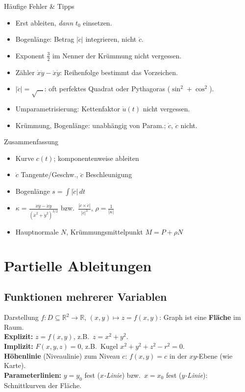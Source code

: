 \documentclass[a4paper, fontsize=7pt]{scrartcl}
\def\R{\mathbb{R}}  %
\def\dt{\,dt}
\begin{document}
\begin{subbox}{Häufige Fehler \& Tipps}
\begin{itemize}
    \item Erst ableiten, \emph{dann} $t_0$ einsetzen.
    \item Bogenlänge: Betrag $|\dot c|$ integrieren, nicht $\dot c$.
    \item Exponent $\frac{3}{2}$ im Nenner der Krümmung nicht vergessen.
    \item Zähler $\dot x \ddot y - \ddot x \dot y$: Reihenfolge bestimmt das
          Vorzeichen.
    \item $|\dot c| = \sqrt{\ldots}$: oft perfektes Quadrat oder
          Pythagoras ($\sin^2 + \cos^2$).
    \item Umparametrisierung: Kettenfaktor $\dot u(t)$ nicht vergessen.
    \item Krümmung, Bogenlänge: unabhängig von Param.; $\dot c$, $\ddot c$ nicht.
\end{itemize}
\end{subbox}

\begin{subbox}{Zusammenfassung}
\begin{itemize}
    \item Kurve $c(t)$; komponentenweise ableiten
    \item $\dot c$ Tangente/Geschw., $\ddot c$ Beschleunigung
    \item Bogenlänge $s = \int |\dot c| \dt$
    \item $\kappa = \frac{\dot x \ddot y - \ddot x \dot y}{(\dot x^2 + \dot y^2)^{3/2}}$
          bzw.\ $\frac{|\dot c \times \ddot c|}{|\dot c|^3}$, $\rho = \frac{1}{|\kappa|}$
    \item Hauptnormale $N$, Krümmungsmittelpunkt $M = P + \rho N$
\end{itemize}
\end{subbox}

\section{Partielle Ableitungen}

\subsection{Funktionen mehrerer Variablen}

\begin{mainbox}{Darstellung}
$f: D \subseteq \R^2 \to \R$, $(x, y) \mapsto z = f(x, y)$: Graph ist eine
\textbf{Fläche} im Raum.\\[2pt]
\textbf{Explizit:} $z = f(x, y)$, z.B.\ $z = x^2 + y^2$.\\
\textbf{Implizit:} $F(x, y, z) = 0$, z.B.\ Kugel $x^2 + y^2 + z^2 - r^2 = 0$.\\[2pt]
\textbf{Höhenlinie} (Niveaulinie) zum Niveau $c$: $f(x, y) = c$ in der
$xy$-Ebene (wie Karte).\\
\textbf{Parameterlinien:} $y = y_0$ fest (\emph{$x$-Linie}) bzw.\ $x = x_0$
fest (\emph{$y$-Linie}): Schnittkurven der Fläche.
\end{mainbox}
\end{document}
